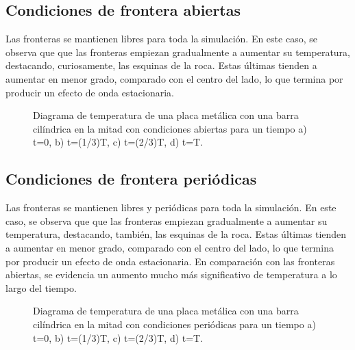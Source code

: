 \documentclass{article}
\begin{document}
\subsection*{Condiciones de frontera abiertas}
Las fronteras se mantienen libres para toda la simulación. En este caso, se observa que que las fronteras empiezan gradualmente a aumentar su temperatura, destacando, curiosamente, las esquinas de la roca. Estas últimas tienden a aumentar en menor grado, comparado con el centro del lado, lo que termina por producir un efecto de onda estacionaria.
\begin{figure}[H]
    \centering
    \caption{Diagrama de temperatura de una placa metálica con una barra cilíndrica en la mitad con condiciones abiertas para un tiempo a) t=0, b) t=(1/3)T, c) t=(2/3)T, d) t=T.}
    \label{fig:CondicionesFijasTemp}
\end{figure}
\subsection*{Condiciones de frontera periódicas}
Las fronteras se mantienen libres y periódicas para toda la simulación. En este caso, se observa que que las fronteras empiezan gradualmente a aumentar su temperatura, destacando, también, las esquinas de la roca. Estas últimas tienden a aumentar en menor grado, comparado con el centro del lado, lo que termina por producir un efecto de onda estacionaria. En comparación con las fronteras abiertas, se evidencia un aumento mucho más significativo de temperatura a lo largo del tiempo.
\begin{figure}[H]
    \centering
    \caption{Diagrama de temperatura de una placa metálica con una barra cilíndrica en la mitad con condiciones periódicas para un tiempo a) t=0, b) t=(1/3)T, c) t=(2/3)T, d) t=T.}
    \label{fig:CondicionesFijasTemp}
\end{figure}
\end{document}

